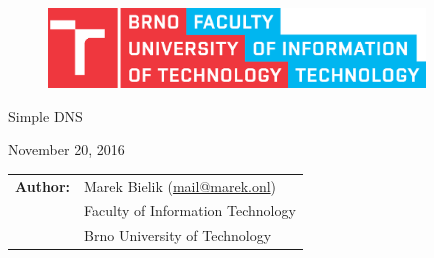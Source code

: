 \begin{titlepage}

\vspace*{2cm}
\begin{figure}[!h]
  \centering
  \includegraphics[width=10cm]{img/FIT_color_CMYK_EN.eps}
\end{figure}

\vfill

\begin{center}
\begin{Huge}
Simple DNS
\end{Huge}
\end{center}

\vfill

\begin{center}
\begin{Large}
November 20, 2016
\end{Large}
\end{center}

\vfill

\begin{flushleft}
\begin{normalsize}
\begin{tabular}{ll}
\bf Author:\hspace{3mm} & Marek Bielik (\url{mail@marek.onl}) \\[3mm]
& Faculty of Information Technology \\
& Brno University of Technology
\end{tabular}
\end{normalsize}
\end{flushleft}
\end{titlepage}
